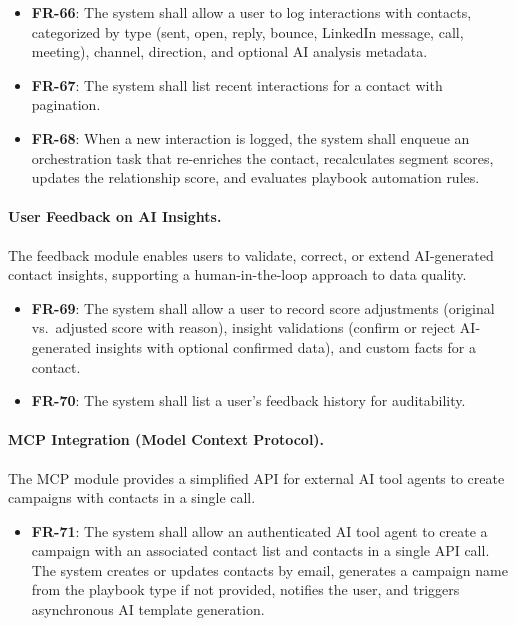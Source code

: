\begin{itemize}
    \item \textbf{FR-66}: The system shall allow a user to log interactions with contacts, categorized by type (sent, open, reply, bounce, LinkedIn message, call, meeting), channel, direction, and optional AI analysis metadata.
    \item \textbf{FR-67}: The system shall list recent interactions for a contact with pagination.
    \item \textbf{FR-68}: When a new interaction is logged, the system shall enqueue an orchestration task that re-enriches the contact, recalculates segment scores, updates the relationship score, and evaluates playbook automation rules.
\end{itemize}

\paragraph{User Feedback on AI Insights.}
The feedback module enables users to validate, correct, or extend AI-generated contact insights, supporting a human-in-the-loop approach to data quality.

\begin{itemize}
    \item \textbf{FR-69}: The system shall allow a user to record score adjustments (original vs.\ adjusted score with reason), insight validations (confirm or reject AI-generated insights with optional confirmed data), and custom facts for a contact.
    \item \textbf{FR-70}: The system shall list a user's feedback history for auditability.
\end{itemize}

\paragraph{MCP Integration (Model Context Protocol).}
The MCP module provides a simplified API for external AI tool agents to create campaigns with contacts in a single call.

\begin{itemize}
    \item \textbf{FR-71}: The system shall allow an authenticated AI tool agent to create a campaign with an associated contact list and contacts in a single API call. The system creates or updates contacts by email, generates a campaign name from the playbook type if not provided, notifies the user, and triggers asynchronous AI template generation.
\end{itemize}


